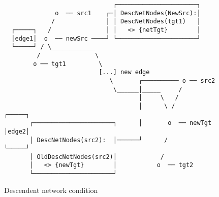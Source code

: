 \documentclass[11pt]{article}
\begin{document}
\begin{figure}[H]
  \begin{verbatim}
                              ┌──────────────────────┐
              o  ── src1    ┌─│ DescNetNodes(NewSrc):│
             /              │ │ DescNetNodes(tgt1)   │
  ┌─────┐   /               │ │   <> {netTgt}        │
  │edge1│  o  ── newSrc ────┘ └──────────────────────┘
  └─────┘ / \____________    
         /               \
        o ── tgt1         \
                          [...] new edge
                             \       ┌────────── o ── src2
                              \______│_____     /
                                     │     \   /
                                     │      \ /           ┌─────┐
       ┌──────────────────────┐      │       o  ── newTgt │edge2│
       │ DescNetNodes(src2):  │──────┘      /             └─────┘
       │ OldDescNetNodes(src2)│            /
       │   <> {newTgt}        │           o  ── tgt2
       └──────────────────────┘ 
  \end{verbatim}
\caption{Descendent network condition}
\end{figure}

\newpage
\end{document}
